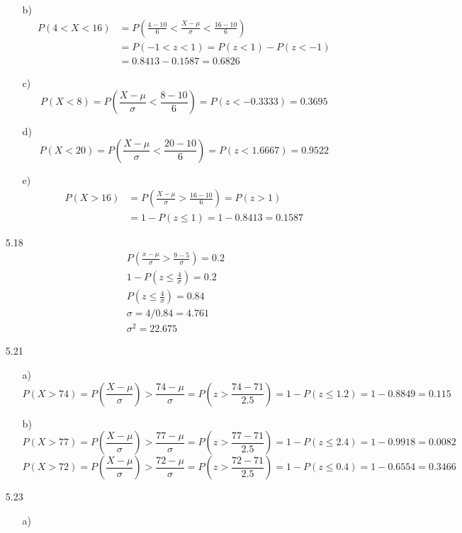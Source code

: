 \documentclass{article}
\begin{document}
\begin{itemize}
\begin{itemize}
        \item [b)]\begin{align*}
            P(4 < X < 16) &= P\left(\frac{4 - 10}{6} < \frac{X - \mu}{\sigma} < \frac{16 - 10}{6}\right) \\ &= P(-1 < z < 1)=P(z < 1) - P(z < -1) \\&= 0.8413 - 0.1587 = 0.6826
        \end{align*}
        \item [c)]
        \[P(X < 8) = P\left(\frac{X - \mu}{\sigma} < \frac{8 - 10}{6}\right) = P\left(z < -0.3333\right)=0.3695\]
        \item [d)]
        \[P(X < 20) = P\left(\frac{X - \mu}{\sigma} < \frac{20 - 10}{6}\right) = P(z < 1.6667)=0.9522\]
        \item [e)]
        \begin{align*}
            P(X > 16) &= P\left(\frac{X - \mu}{\sigma} > \frac{16 - 10}{6}\right) = P(z > 1)\\&=1 - P(z \leq 1) = 1 - 0.8413 = 0.1587
        \end{align*}
    \end{itemize}
    \item [5.18]
    \begin{align*}
        P(\frac{x-\mu}{\sigma}>\frac{9-5}{\sigma})=0.2\\
        1-P(z\leq \frac{4}{\sigma}) = 0.2\\
        P(z\leq \frac{4}{\sigma})=0.84\\
        \sigma = 4/0.84 = 4.761\\
        \sigma^2 = 22.675
    \end{align*}
    \item [5.21]
    \begin{itemize}
        \item [a)]
        \[P(X>74) = P(\frac{X-\mu}{\sigma})>\frac{74-\mu}{\sigma}=P(z>\frac{74-71}{2.5})=1-P(z\leq 1.2)=1-0.8849 = 0.115\]
        \item [b)]
        \[P(X>77) = P(\frac{X-\mu}{\sigma})>\frac{77-\mu}{\sigma}=P(z>\frac{77-71}{2.5})=1-P(z\leq 2.4)=1-0.9918 = 0.0082\]
        \[P(X>72) = P(\frac{X-\mu}{\sigma})>\frac{72-\mu}{\sigma}=P(z>\frac{72-71}{2.5})=1-P(z\leq 0.4)=1-0.6554 = 0.3466\]
    \end{itemize}
    \item [5.23]
    \begin{itemize}
        \item [a)]
        \begin{align*}

\end{align*}
\end{itemize}
\end{itemize}
\end{document}
